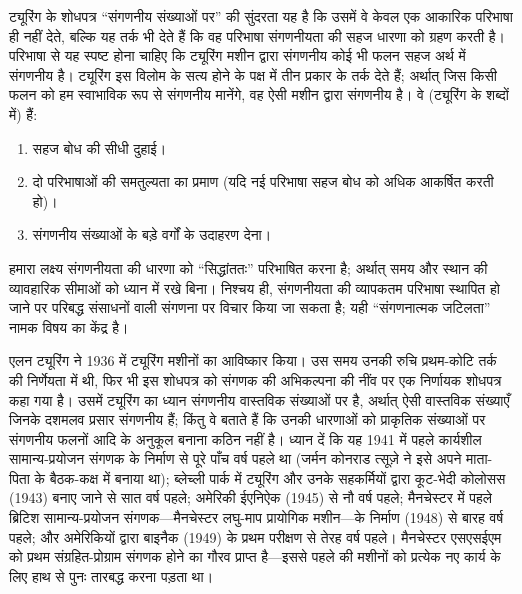 \documentclass[../../../include/open-logic-section]{subfiles}
\begin{document}
\begin{digress}
ट्यूरिंग के शोधपत्र ``संगणनीय संख्याओं पर'' की सुंदरता यह है कि उसमें
वे केवल एक आकारिक परिभाषा ही नहीं देते, बल्कि यह तर्क भी देते हैं कि वह
परिभाषा संगणनीयता की सहज धारणा को ग्रहण करती है। परिभाषा से यह स्पष्ट
होना चाहिए कि ट्यूरिंग मशीन द्वारा संगणनीय कोई भी फलन सहज अर्थ में
संगणनीय है। ट्यूरिंग इस विलोम के सत्य होने के पक्ष में तीन प्रकार के
तर्क देते हैं; अर्थात् जिस किसी फलन को हम स्वाभाविक रूप से संगणनीय
मानेंगे, वह ऐसी मशीन द्वारा संगणनीय है। वे (ट्यूरिंग के शब्दों में) हैं:
\begin{enumerate}
\item सहज बोध की सीधी दुहाई।
\item दो परिभाषाओं की समतुल्यता का प्रमाण (यदि नई परिभाषा सहज बोध को
  अधिक आकर्षित करती हो)।
\item संगणनीय संख्याओं के बड़े वर्गों के उदाहरण देना।
\end{enumerate}
हमारा लक्ष्य संगणनीयता की धारणा को ``सिद्धांततः'' परिभाषित करना है;
अर्थात् समय और स्थान की व्यावहारिक सीमाओं को ध्यान में रखे बिना। निश्चय
ही, संगणनीयता की व्यापकतम परिभाषा स्थापित हो जाने पर परिबद्ध संसाधनों
वाली संगणना पर विचार किया जा सकता है; यही ``संगणनात्मक जटिलता'' नामक
विषय का केंद्र है।
\end{digress}

\begin{history}
एलन ट्यूरिंग ने 1936 में ट्यूरिंग मशीनों का आविष्कार किया। उस समय उनकी
रुचि प्रथम-कोटि तर्क की निर्णेयता में थी, फिर भी इस शोधपत्र को संगणक की
अभिकल्पना की नींव पर एक निर्णायक शोधपत्र कहा गया है। उसमें ट्यूरिंग का
ध्यान संगणनीय वास्तविक संख्याओं पर है, अर्थात् ऐसी वास्तविक संख्याएँ
जिनके दशमलव प्रसार संगणनीय हैं; किंतु वे बताते हैं कि उनकी धारणाओं को
प्राकृतिक संख्याओं पर संगणनीय फलनों आदि के अनुकूल बनाना कठिन नहीं है।
ध्यान दें कि यह 1941 में पहले कार्यशील सामान्य-प्रयोजन संगणक के निर्माण
से पूरे पाँच वर्ष पहले था (जर्मन कोनराड त्सूज़े ने इसे अपने माता-पिता के
बैठक-कक्ष में बनाया था); ब्लेच्ली पार्क में ट्यूरिंग और उनके सहकर्मियों
द्वारा कूट-भेदी कोलोसस (1943) बनाए जाने से सात वर्ष पहले; अमेरिकी
ईएनिऐक (1945) से नौ वर्ष पहले; मैनचेस्टर में पहले ब्रिटिश सामान्य-प्रयोजन
संगणक---मैनचेस्टर लघु-माप प्रायोगिक मशीन---के निर्माण (1948) से बारह
वर्ष पहले; और अमेरिकियों द्वारा बाइनैक (1949) के प्रथम परीक्षण से तेरह
वर्ष पहले। मैनचेस्टर एसएसईएम को प्रथम संग्रहित-प्रोग्राम संगणक होने का
गौरव प्राप्त है---इससे पहले की मशीनों को प्रत्येक नए कार्य के लिए हाथ से
पुनः तारबद्ध करना पड़ता था।
\end{history}
\end{document}
